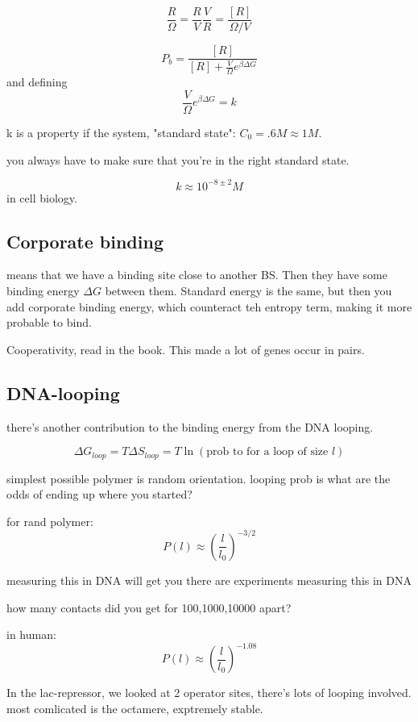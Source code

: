 \documentclass{article}
\begin{document}
\begin{equation}
	\frac{R}{\Omega} = \frac{R}{V}\frac{V}{R} = \frac{[R]}{\Omega /V}
\end{equation}


\begin{equation}
	P_b = \frac{[R]}{[R] + \frac{V}{\Omega}e ^ {\beta\Delta G} }
\end{equation}
and defining 
\begin{equation}
	\frac{V}{\Omega}e ^ {\beta\Delta G}  = k
\end{equation}

k  is a property if the system, "standard state": $C_0 = .6M \approx 1M$. 

you always have to make sure that you're in the right standard state. 

\begin{equation}
	k \approx 10^{-8\pm 2}M
\end{equation}
in cell biology. 




\subsection{Corporate binding}
means that we have a binding site close to another BS. Then they have some binding energy $\Delta G$ between them. Standard energy is the same, but then you add corporate binding energy, which counteract teh entropy term, making it more probable to bind. 

Cooperativity, read in the book. This made a lot of genes occur in pairs. 


\subsection{DNA-looping}
there's another contribution to the binding energy from the DNA looping. 

\begin{equation}
	\Delta G_{loop} = T\Delta S_{loop}= T\ln (\text{prob to for a loop of size }l)
\end{equation}


simplest possible polymer is random orientation. looping prob is what are the odds of ending up where you started?

for rand polymer: 
\begin{equation}
	P(l) \approx \left(\frac{l}{l_0}\right)^{-3/2}
\end{equation}

measuring this in DNA will get you 
there are experiments measuring this in DNA

how many contacts did you get for 100,1000,10000 apart? 

in human: 
\begin{equation}
	P(l) \approx \left(\frac{l}{l_0}\right)^{-1.08}
\end{equation}

In the lac-repressor, we looked at 2 operator sites, there's lots of looping involved. most comlicated is the octamere, exptremely stable. 
\end{document}
